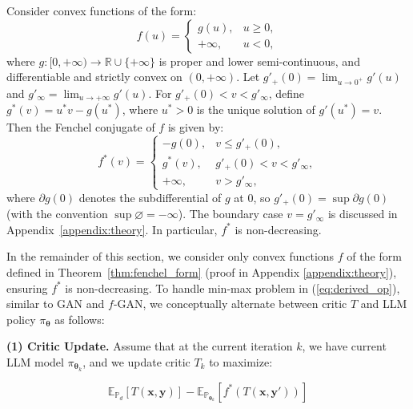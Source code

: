 \begin{theorem} \label{thm:fenchel_form}
Consider convex functions of the form:
\begin{equation}
f(u) = \begin{cases}
g(u), & u \geq 0, \\
+\infty, & u < 0,
\end{cases}
\end{equation}
where $g: [0, +\infty) \to \mathbb{R} \cup \{+\infty\}$ is proper and lower semi-continuous, and differentiable and strictly convex on $(0, +\infty)$. Let $g'_+(0) = \lim_{u \to 0^+} g'(u)$ and $g'_\infty = \lim_{u \to +\infty} g'(u)$. For $g'_+(0) < v < g'_\infty$, define $g^*(v) = u^* v - g(u^*)$, where $u^* > 0$ is the unique solution of $g'(u^*) = v$. Then the Fenchel conjugate of $f$ is given by:
\begin{equation}
f^*(v) = \begin{cases}
-g(0), & v \leq g'_+(0), \\
g^*(v), & g'_+(0) < v < g'_\infty, \\
+\infty, & v > g'_\infty,
\end{cases}
\end{equation}
where $\partial g(0)$ denotes the subdifferential of $g$ at $0$, so $g'_+(0)=\sup \partial g(0)$ (with the convention $\sup \varnothing = -\infty$). The boundary case $v = g'_\infty$ is discussed in Appendix~\ref{appendix:theory}. In particular, $f^*$ is non-decreasing.
\end{theorem}

In the remainder of this section, we consider only convex functions $f$ of the form defined in Theorem~\ref{thm:fenchel_form} (proof in Appendix \ref{appendix:theory}), ensuring $f^*$ is non-decreasing. To handle min-max problem in (\ref{eq:derived_op}), similar to GAN and $f$-GAN, we conceptually alternate between critic $T$ and LLM policy $\pi_{\boldsymbol{\theta}}$ as follows:

\noindent\textbf{(1) Critic Update.} Assume that at the current iteration $k$, we have current LLM model $\pi_{\boldsymbol{\theta}_k}$, and we update critic $T_k$ to maximize:

\begin{equation}
\mathbb{E}_{\mathbb{P}_{d}}\left[T\left(\boldsymbol{x},\boldsymbol{y}\right)\right]-\mathbb{E}_{\mathbb{P}_{\boldsymbol{\theta}_{k}}}\left[f^{*}\left(T\left(\boldsymbol{x},\boldsymbol{y}'\right)\right)\right]
\end{equation}


